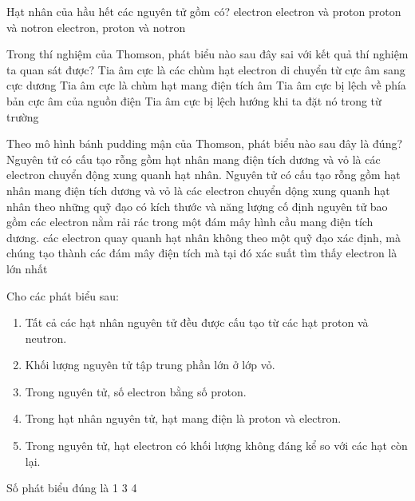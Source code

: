 \begin{ex}[1]
	Hạt nhân của hầu hết các nguyên tử gồm có?
	\choice
	{%
		electron
	}
	{%
		electron và proton
	}
	{%
		\True proton và notron
	}
	{%
		electron, proton và notron
	}
	\sodongkeex[5]
\end{ex}

\begin{ex}[2]
	Trong thí nghiệm của Thomson, phát biểu nào sau đây sai với kết quả thí nghiệm ta quan sát được?
	\choice
	{%
		Tia âm cực là các chùm hạt electron di chuyển từ cực âm sang cực dương
	}
	{%
		Tia âm cực là chùm hạt mang điện tích âm
	}
	{%
		\True	Tia âm cực bị lệch về phía bản cực âm của nguồn điện
	}
	{%
		Tia âm cực bị lệch hướng khi ta đặt nó trong từ trường
	}
	\sodongkeex[5]
\end{ex}

\begin{ex}[2]
	Theo mô hình bánh pudding mận của Thomson, phát biểu nào sau đây là đúng?
	\choice
	{%
		Nguyên tử có cấu tạo rỗng gồm hạt nhân mang điện tích dương và vỏ là các electron chuyển động xung quanh hạt nhân.
	}
	{%
		Nguyên tử có cấu tạo rỗng gồm hạt nhân mang điện tích dương và vỏ là các electron chuyển dộng xung quanh hạt nhân theo những quỹ đạo có kích thước và năng lượng cố định
	}
	{%
		\True	nguyên tử bao gồm các electron nằm rải rác trong một đám mây hình cầu mang điện tích dương.
	}
	{%
		các electron  quay quanh hạt nhân không theo một quỹ đạo xác định, mà chúng tạo thành các đám mây điện tích mà tại đó xác suất tìm thấy electron là lớn nhất
	}
	\sodongkeex[5]
\end{ex}
\begin{ex}[2]
	Cho các phát biểu sau:
	\begin{enumerate}[(1)]
		\item Tất cả các hạt nhân nguyên tử đều được cấu tạo từ các hạt proton và neutron.
		\item Khối lượng nguyên tử tập trung phần lớn ở lớp vỏ.
		\item Trong nguyên tử, số electron bằng số proton.
		\item Trong hạt nhân nguyên tử, hạt mang điện là proton và electron.
		\item Trong nguyên tử, hạt electron có khối lượng không đáng kể so với các hạt còn lại.
	\end{enumerate}
	Số phát biểu đúng là
	\choice
	{%
		1
	}
	{%
	}
	{%
		3
	}
	{%
		4
	}
	
\end{ex}

